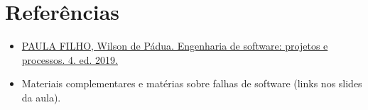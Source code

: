 \documentclass[12pt,a4paper]{article}
\begin{document}
\section{Referências}
\begin{itemize}[leftmargin=*,itemsep=0.25em]
  \item \href{../99-Materiais/Engenharia%20de%20software%20projetos%20e%20processos%20by%20Wilson%20de%20P%C3%A1dua%20Paula%20Filho%20.epub.pdf}{PAULA FILHO, Wilson de Pádua. Engenharia de software: projetos e processos. 4. ed. 2019.}
  \item Materiais complementares e matérias sobre falhas de software (links nos slides da aula).
\end{itemize}
\end{document}
